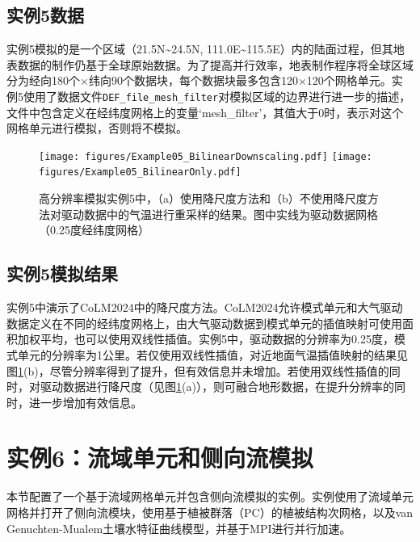 \subsection{实例5数据}

实例5模拟的是一个区域（21.5\textdegree N\textasciitilde 24.5\textdegree N, 111.0\textdegree E\textasciitilde 115.5\textdegree E）内的陆面过程，但其地表数据的制作仍基于全球原始数据。为了提高并行效率，地表制作程序将全球区域分为经向180个×纬向90个数据块，每个数据块最多包含120×120个网格单元。实例5使用了数据文件\texttt{DEF\_file\_mesh\_filter}对模拟区域的边界进行进一步的描述，文件中包含定义在经纬度网格上的变量`mesh\_filter'，其值大于0时，表示对这个网格单元进行模拟，否则将不模拟。

\begin{figure}[htpb]
    \centering
    \texttt{[image: figures/Example05\_BilinearDownscaling.pdf]}
    \texttt{[image: figures/Example05\_BilinearOnly.pdf]}
    \caption{高分辨率模拟实例5中，（a）使用降尺度方法和（b）不使用降尺度方法对驱动数据中的气温进行重采样的结果。图中实线为驱动数据网格（0.25度经纬度网格）}
    \label{fig:fig_hiresdownscaling}
\end{figure}

\subsection{实例5模拟结果}

实例5中演示了CoLM2024中的降尺度方法。CoLM2024允许模式单元和大气驱动数据定义在不同的经纬度网格上，由大气驱动数据到模式单元的插值映射可使用面积加权平均，也可以使用双线性插值。实例5中，驱动数据的分辨率为0.25度，模式单元的分辨率为1公里。若仅使用双线性插值，对近地面气温插值映射的结果见图\ref{fig:fig_hiresdownscaling}(b)，尽管分辨率得到了提升，但有效信息并未增加。若使用双线性插值的同时，对驱动数据进行降尺度（见图\ref{fig:fig_hiresdownscaling}(a)），则可融合地形数据，在提升分辨率的同时，进一步增加有效信息。



\section{实例6：流域单元和侧向流模拟}

本节配置了一个基于流域网格单元并包含侧向流模拟的实例。实例使用了流域单元网格并打开了侧向流模块，使用基于植被群落（PC）的植被结构次网格，以及van Genuchten-Mualem土壤水特征曲线模型，并基于MPI进行并行加速。

